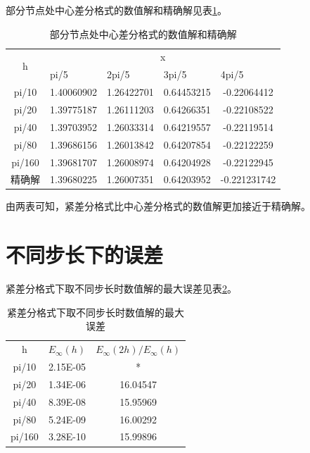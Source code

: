 \documentclass[withoutpreface,bwprint]{cumcmthesis} %
\begin{document}
	部分节点处中心差分格式的数值解和精确解见表\ref{tab:2}。
	\begin{table}[htbp]
		\centering
		\caption{部分节点处中心差分格式的数值解和精确解}
		\begin{tabular}{ccccc}
			\toprule[1.5pt]
			\multicolumn{1}{c}{\multirow{2}[0]{*}{h}} & \multicolumn{4}{c}{x} \\
			& \multicolumn{1}{l}{pi/5} & \multicolumn{1}{l}{2pi/5} & \multicolumn{1}{l}{3pi/5} & \multicolumn{1}{l}{4pi/5} \\
			\midrule[1pt]
			pi/10 & 1.40060902  & 1.26422701  & 0.64453215  & -0.22064412  \\
			pi/20 & 1.39775187  & 1.26111203  & 0.64266351  & -0.22108522  \\
			pi/40 & 1.39703952  & 1.26033314  & 0.64219557  & -0.22119514  \\
			pi/80 & 1.39686156  & 1.26013842  & 0.64207854  & -0.22122259  \\
			pi/160 & 1.39681707  & 1.26008974  & 0.64204928  & -0.22122945  \\
			精确解   & 1.39680225 & 1.26007351 & 0.64203952 & -0.221231742 \\
			\bottomrule[1.5pt]
		\end{tabular}%
		\label{tab:2}%
	\end{table}%
	
	由两表可知，紧差分格式比中心差分格式的数值解更加接近于精确解。
	\section{不同步长下的误差}
	紧差分格式下取不同步长时数值解的最大误差见表\ref{tab:3}。
	\begin{table}[htbp]
		\centering
		\caption{紧差分格式下取不同步长时数值解的最大误差}
		\begin{tabular}{ccc}
			\toprule[1.5pt]
			\multicolumn{1}{c}{\multirow{2}[0]{*}{h}} & \multicolumn{1}{c}{\multirow{2}[0]{*}{$E_{\infty}(h)$}} & \multicolumn{1}{c}{\multirow{2}[0]{*}{$E_{\infty}(2h)/E_{\infty}(h)$}} \\
			&       &  \\
			\midrule[1pt]
			pi/10 & 2.15E-05 & \multicolumn{1}{c}{*} \\
			pi/20 & 1.34E-06 & 16.04547 \\
			pi/40 & 8.39E-08 & 15.95969 \\
			pi/80 & 5.24E-09 & 16.00292 \\
			pi/160 & 3.28E-10 & 15.99896 \\
			\bottomrule[1.5pt]
		\end{tabular}%
		\label{tab:3}%
	\end{table}%
	
\end{document}
